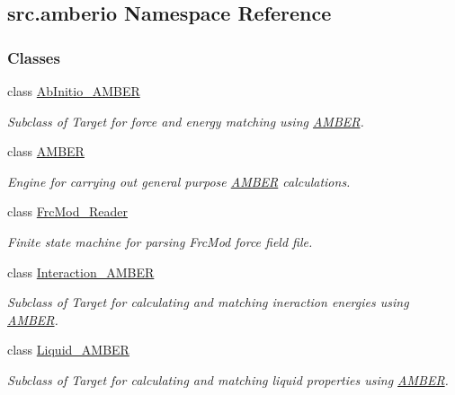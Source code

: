 \hypertarget{namespacesrc_1_1amberio}{}\subsection{src.\+amberio Namespace Reference}
\label{namespacesrc_1_1amberio}
\subsubsection*{Classes}
\begin{DoxyCompactItemize}
\item 
class \hyperlink{classsrc_1_1amberio_1_1AbInitio__AMBER}{Ab\+Initio\+\_\+\+A\+M\+B\+ER}
\begin{DoxyCompactList}\small\item\em Subclass of Target for force and energy matching using \hyperlink{classsrc_1_1amberio_1_1AMBER}{A\+M\+B\+ER}. \end{DoxyCompactList}\item 
class \hyperlink{classsrc_1_1amberio_1_1AMBER}{A\+M\+B\+ER}
\begin{DoxyCompactList}\small\item\em Engine for carrying out general purpose \hyperlink{classsrc_1_1amberio_1_1AMBER}{A\+M\+B\+ER} calculations. \end{DoxyCompactList}\item 
class \hyperlink{classsrc_1_1amberio_1_1FrcMod__Reader}{Frc\+Mod\+\_\+\+Reader}
\begin{DoxyCompactList}\small\item\em Finite state machine for parsing Frc\+Mod force field file. \end{DoxyCompactList}\item 
class \hyperlink{classsrc_1_1amberio_1_1Interaction__AMBER}{Interaction\+\_\+\+A\+M\+B\+ER}
\begin{DoxyCompactList}\small\item\em Subclass of Target for calculating and matching ineraction energies using \hyperlink{classsrc_1_1amberio_1_1AMBER}{A\+M\+B\+ER}. \end{DoxyCompactList}\item 
class \hyperlink{classsrc_1_1amberio_1_1Liquid__AMBER}{Liquid\+\_\+\+A\+M\+B\+ER}
\begin{DoxyCompactList}\small\item\em Subclass of Target for calculating and matching liquid properties using \hyperlink{classsrc_1_1amberio_1_1AMBER}{A\+M\+B\+ER}. \end{DoxyCompactList}\item 

\end{DoxyCompactItemize}
